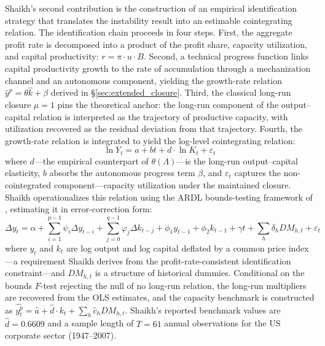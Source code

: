 \documentclass[11pt,a4paper]{article}
\begin{document}
Shaikh's second contribution is the construction of an empirical identification strategy that translates the instability result into an estimable cointegrating relation. The identification chain proceeds in four steps. First, the aggregate profit rate is decomposed into a product of the profit share, capacity utilization, and capital productivity: $r = \pi \cdot u \cdot B$. Second, a technical progress function links capital productivity growth to the rate of accumulation through a mechanization channel and an autonomous component, yielding the growth-rate relation $\hat{y}^p = \theta\hat{k} + \beta$ derived in \S\ref{sec:extended_closure}. Third, the classical long-run closure $\mu = 1$ pins the theoretical anchor: the long-run component of the output--capital relation is interpreted as the trajectory of productive capacity, with utilization recovered as the residual deviation from that trajectory. Fourth, the growth-rate relation is integrated to yield the log-level cointegrating relation:
%
\begin{equation}\label{eq:shaikh_coint_s33}
	\ln Y_t = a + bt + d \cdot \ln K_t + \varepsilon_t
\end{equation}
%
where $d$---the empirical counterpart of $\theta(\Lambda)$---is the long-run output--capital elasticity, $b$ absorbs the autonomous progress term $\beta$, and $\varepsilon_t$ captures the non-cointegrated component---capacity utilization under the maintained closure. Shaikh operationalizes this relation using the ARDL bounds-testing framework of \citet{Pesaran2001}, estimating it in error-correction form:
%
\begin{equation}\label{eq:shaikh_ecm_s33}
	\Delta y_t = \alpha + \sum_{i=1}^{p-1}\psi_i \Delta y_{t-i} + \sum_{j=0}^{q-1}\varphi_j \Delta k_{t-j} + \phi_1 y_{t-1} + \phi_2 k_{t-1} + \gamma t + \sum_h \delta_h DM_{h,t} + \varepsilon_t
\end{equation}
%
where $y_t$ and $k_t$ are log output and log capital deflated by a common price index---a requirement Shaikh derives from the profit-rate-consistent identification constraint---and $DM_{h,t}$ is a structure of historical dummies. Conditional on the bounds $F$-test rejecting the null of no long-run relation, the long-run multipliers are recovered from the OLS estimates, and the capacity benchmark is constructed as $\widehat{y_t^p} = \hat{a} + \hat{d} \cdot k_t + \sum_h \hat{c}_h DM_{h,t}$. Shaikh's reported benchmark values are $\hat{d} = 0.6609$ and a sample length of $T = 61$ annual observations for the US corporate sector (1947--2007).
\end{document}
